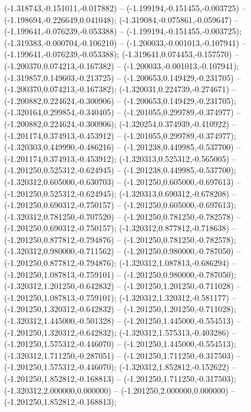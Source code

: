  (-1.318743,-0.151011,-0.017882) -- (-1.199194,-0.151455,-0.003725) -- (-1.198694,-0.226649,0.041048);
 (-1.319084,-0.075861,-0.059647) -- (-1.199641,-0.076239,-0.053388) -- (-1.199194,-0.151455,-0.003725);
 (-1.319383,-0.000704,-0.106210) -- (-1.200033,-0.001013,-0.107941) -- (-1.199641,-0.076239,-0.053388);
 (-1.319641,0.074453,-0.157570) -- (-1.200370,0.074213,-0.167382) -- (-1.200033,-0.001013,-0.107941);
 (-1.319857,0.149603,-0.213725) -- (-1.200653,0.149429,-0.231705) -- (-1.200370,0.074213,-0.167382);
 (-1.320031,0.224739,-0.274671) -- (-1.200882,0.224624,-0.300906) -- (-1.200653,0.149429,-0.231705);
 (-1.320164,0.299854,-0.340405) -- (-1.201055,0.299789,-0.374977) -- (-1.200882,0.224624,-0.300906);
 (-1.320254,0.374939,-0.410922) -- (-1.201174,0.374913,-0.453912) -- (-1.201055,0.299789,-0.374977);
 (-1.320303,0.449990,-0.486216) -- (-1.201238,0.449985,-0.537700) -- (-1.201174,0.374913,-0.453912);
 (-1.320313,0.525312,-0.565005) -- (-1.201250,0.525312,-0.624945) -- (-1.201238,0.449985,-0.537700);
 (-1.320312,0.605000,-0.630703) -- (-1.201250,0.605000,-0.697613) -- (-1.201250,0.525312,-0.624945);
 (-1.320313,0.690312,-0.678208) -- (-1.201250,0.690312,-0.750157) -- (-1.201250,0.605000,-0.697613);
 (-1.320312,0.781250,-0.707520) -- (-1.201250,0.781250,-0.782578) -- (-1.201250,0.690312,-0.750157);
 (-1.320312,0.877812,-0.718638) -- (-1.201250,0.877812,-0.794876) -- (-1.201250,0.781250,-0.782578);
 (-1.320312,0.980000,-0.711562) -- (-1.201250,0.980000,-0.787050) -- (-1.201250,0.877812,-0.794876);
 (-1.320312,1.087813,-0.686294) -- (-1.201250,1.087813,-0.759101) -- (-1.201250,0.980000,-0.787050);
 (-1.320312,1.201250,-0.642832) -- (-1.201250,1.201250,-0.711028) -- (-1.201250,1.087813,-0.759101);
 (-1.320312,1.320312,-0.581177) -- (-1.201250,1.320312,-0.642832) -- (-1.201250,1.201250,-0.711028);
 (-1.320312,1.445000,-0.501328) -- (-1.201250,1.445000,-0.554513) -- (-1.201250,1.320312,-0.642832);
 (-1.320312,1.575313,-0.403286) -- (-1.201250,1.575312,-0.446070) -- (-1.201250,1.445000,-0.554513);
 (-1.320312,1.711250,-0.287051) -- (-1.201250,1.711250,-0.317503) -- (-1.201250,1.575312,-0.446070);
 (-1.320312,1.852812,-0.152622) -- (-1.201250,1.852812,-0.168813) -- (-1.201250,1.711250,-0.317503);
 (-1.320312,2.000000,0.000000) -- (-1.201250,2.000000,0.000000) -- (-1.201250,1.852812,-0.168813);
